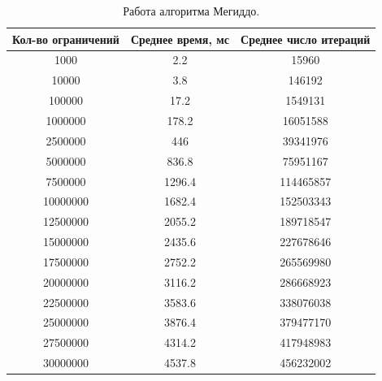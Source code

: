 \documentclass[12pt,a4paper]{article}
\begin{document}
\begin{table}[h!]
\caption{\label{tab:Meg}Работа алгоритма Мегиддо.}
\begin{center}
\begin{tabular}{|c|c|c|}
\hline
Кол-во ограничений & Среднее время, мс  & Среднее число итераций\\%
\hline
1000 & 2.2 & 15960 \\%
\hline
10000 & 3.8 & 146192\\ %
\hline
100000 & 17.2 & 1549131\\%
\hline
1000000 & 178.2 & 16051588\\%
\hline
2500000 & 446 & 39341976\\%
\hline
5000000 & 836.8 & 75951167\\%
\hline
7500000 & 1296.4 & 114465857\\%
\hline
10000000 & 1682.4 & 152503343\\%
\hline
12500000 & 2055.2 & 189718547\\%
\hline
15000000 & 2435.6 & 227678646\\%
\hline
17500000 & 2752.2 & 265569980\\%
\hline
20000000 & 3116.2 & 286668923\\%
\hline
22500000 & 3583.6 & 338076038\\%
\hline
25000000 & 3876.4 & 379477170\\%
\hline
27500000 & 4314.2 & 417948983\\%
\hline
30000000 & 4537.8 & 456232002\\%
\hline
\end{tabular}
\end{center}
\end{table} 
\end{document}
